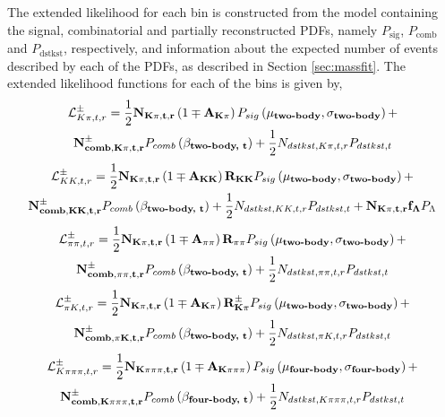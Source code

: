 The extended likelihood for each bin is constructed from the model containing the signal, combinatorial and partially reconstructed PDFs, namely $P_{\text{sig}}$, $P_{\text{comb}}$ and $P_{\text{dstkst}}$, respectively, and information about the expected number of events described by each of the PDFs, as described in Section \ref{sec:massfit}. The extended likelihood functions for each of the bins is given by,
\begin{multline}
\mathcal{L}_{K\pi, t, r}^{\pm} = \frac{1}{2}\mathbf{N_{K\pi, t, r}}\left(1 \mp \mathbf{A_{K\pi}}\right)P_{sig}\left(\mathbf{\mu_\text{\textbf{two-body}}},\mathbf{\sigma_\text{\textbf{two-body}}}\right) + \\ \mathbf{N_{comb, K\pi, t, r}^{\pm}}P_{comb}\left(\mathbf{\beta_\text{\textbf{two-body, t}}}\right) + \frac{1}{2}N_{dstkst, K\pi, t, r}P_{dstkst, t}
\label{kpilikelihood}
\end{multline}
\begin{multline}
\mathcal{L}_{KK, t, r}^{\pm} = \frac{1}{2}\mathbf{N_{K\pi, t, r}}\left(1 \mp \mathbf{A_{KK}}\right)\mathbf{R_{KK}} P_{sig}\left(\mathbf{\mu_\text{\textbf{two-body}}},\mathbf{\sigma_\text{\textbf{two-body}}}\right) + \\ \mathbf{N_{comb, KK, t, r}^{\pm}}P_{comb}\left(\mathbf{\beta_\text{\textbf{two-body, t}}}\right) + \frac{1}{2}N_{dstkst, KK, t, r}P_{dstkst, t} + \mathbf{N_{K\pi, t, r}}\mathbf{f_{\Lambda}}P_{\Lambda}
\end{multline}
\begin{multline}
\mathcal{L}_{\pi\pi, t, r}^{\pm} = \frac{1}{2}\mathbf{N_{K\pi, t, r}}\left(1 \mp \mathbf{A_{\pi\pi}}\right)\mathbf{R_{\pi\pi}} P_{sig}\left(\mathbf{\mu_\text{\textbf{two-body}}},\mathbf{\sigma_\text{\textbf{two-body}}}\right) + \\ \mathbf{N_{comb, \pi\pi, t, r}^{\pm}}P_{comb}\left(\mathbf{\beta_\text{\textbf{two-body, t}}}\right) + \frac{1}{2}N_{dstkst, \pi\pi, t, r}P_{dstkst, t}
\end{multline}
\begin{multline}
\mathcal{L}_{\pi K, t, r}^{\pm} = \frac{1}{2}\mathbf{N_{K\pi, t, r}}\left(1 \mp \mathbf{A_{K\pi}}\right)\mathbf{R_{K\pi}^{\pm}} P_{sig}\left(\mathbf{\mu_\text{\textbf{two-body}}},\mathbf{\sigma_\text{\textbf{two-body}}}\right) + \\ \mathbf{N_{comb, \pi K, t, r}^{\pm}}P_{comb}\left(\mathbf{\beta_\text{\textbf{two-body, t}}}\right) + \frac{1}{2}N_{dstkst, \pi K, t, r}P_{dstkst, t}
\end{multline}
\begin{multline}
\mathcal{L}_{K\pi\pi\pi, t, r}^{\pm} = \frac{1}{2}\mathbf{N_{K\pi\pi\pi, t, r}}\left(1 \mp \mathbf{A_{K\pi\pi\pi}}\right)P_{sig}\left(\mathbf{\mu_\text{\textbf{four-body}}},\mathbf{\sigma_\text{\textbf{four-body}}}\right) + \\ \mathbf{N_{comb, K\pi\pi\pi, t, r}^{\pm}}P_{comb}\left(\mathbf{\beta_\text{\textbf{four-body, t}}}\right) + \frac{1}{2}N_{dstkst, K\pi\pi\pi, t, r}P_{dstkst, t}
\end{multline}
